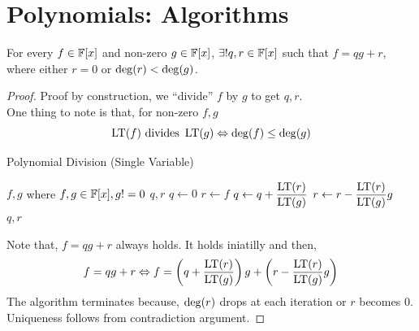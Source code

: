 \documentclass[a4paper,11pt]{article}
\begin{document}
\section{Polynomials: Algorithms}
\begin{prop}
    For every $f\in\mathbb{F}[x]$ and non-zero $g\in\mathbb{F}[x]$, $\exists! q,r\in\mathbb{F}[x]$ such that $f=qg+r$, where either $r=0$ or $\operatorname{deg}(r)<\operatorname{deg}(g)$.
\end{prop}
\vspace{-1em}
\begin{proof}
    Proof by construction, we ``divide'' $f$ by $g$ to get $q,r$.\\
    One thing to note is that, for non-zero $f,g$
    \begin{equation}
        \operatorname{LT}(f) \text{ divides } \operatorname{LT}(g) \Leftrightarrow \operatorname{deg}(f) \leq \operatorname{deg}(g)
    \end{equation}
    \begin{center}
        \begin{algorithm}
        \caption{Polynomial Division (Single Variable)}\label{alg:polynomialdivisionsingle}
        \begin{algorithmic}
        \Require $f,g$ where $f,g \in\mathbb{F}[x], g!=0$
        \Ensure $q,r$
        \State $q \gets 0$
        \State $r \gets f$
        \State $q \gets q+\dfrac{\operatorname{LT}(r)}{\operatorname{LT}(g)}$
        \State $r \gets r-\dfrac{\operatorname{LT}(r)}{\operatorname{LT}(g)}g$ %
        \EndWhile \\ 
        \Return $q,r$
        \end{algorithmic}
        \end{algorithm}
    \end{center}
    Note that, $f=qg+r$ always holds. It holds iniatilly and then,
    \begin{equation}
        f=qg+r \Leftrightarrow
        f=\left(q+\dfrac{\operatorname{LT}(r)}{\operatorname{LT}(g)}\right)g+\left(r-\dfrac{\operatorname{LT}(r)}{\operatorname{LT}(g)}g\right)
    \end{equation}
    The algorithm terminates because, $\operatorname{deg}(r)$ drops at each iteration or $r$ becomes 0.\\
    Uniqueness follows from contradiction argument.
\end{proof}
\end{document}
